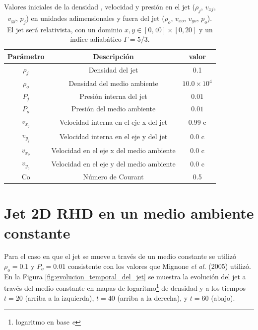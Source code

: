 \documentclass[12pt,a4paper]{book}
\begin{document}
\begin{table}[htbp]
\begin{center}
\begin{tabular}{|c|c|c|}
\hline 
\textbf{Parámetro} & \textbf{Descripción} & \textbf{valor} \\ 
\hline 
$\rho_{j}$ &  Densidad del jet & 0.1  \\ 
\hline 
$\rho_{o}$ &  Densidad del medio ambiente & $10.0 \times 10^{4}$   \\
\hline 
$P_{j}$ & Presión interna del jet& $0.01 $ \\ 
\hline 
$P_{o}$ &  Presión del medio ambiente & $0.01 $  \\ 
\hline 
$v_{x_{j}}$ & Velocidad interna en el eje x del jet & 0.99 c \\ 
\hline 
$v_{y_{j}}$ & Velocidad interna en el eje y del jet & 0.0 c \\ 
\hline 
$v_{x_{o}}$ & Velocidad en el eje x del medio ambiente & 0.0 c \\
\hline 
$v_{y_{o}}$ & Velocidad en el eje y del medio ambiente & 0.0 c \\ 
\hline 
Co & Número de Courant & 0.5 \\ 
\hline 
\end{tabular}
\caption{\label{Cuadro: propiedades-jet-comparacion} Valores iniciales de la densidad ,
velocidad  y presión  en el jet ($\rho_j$, $v_{xj}$, $v_{yj}$, $p_j$) {\color {red} en unidades adimensionales} y fuera del jet 
($\rho_o$, $v_{xo}$, $v_{yo}$, $p_o$). El jet será relativista, con un dominio 
$x, y \in [0,40]\times[0,20]$ y un índice adiabático $\Gamma = 5/3$.}
\end{center}
\end{table}

\section{Jet 2D RHD en un medio ambiente constante}

Para el caso en que el jet se mueve a través de un medio constante se utilizó 
$\rho_o = 0.1 $ y $P_o = 0.01$ {\color {red} consistente con los valores que Mignone \emph{et al.} (2005) utilizó}. 
En la Figura \ref{fig:evolucion_temporal_del_jet} se muestra la evolución del jet a 
través del medio constante en mapas de {\color {red} logaritmo\footnote{logaritmo en base \emph{e}} de densidad} y a los tiempos $t = 20$ 
(arriba a la izquierda), $t = 40$ (arriba a la derecha), y $t = 60$ (abajo).
\end{document}
